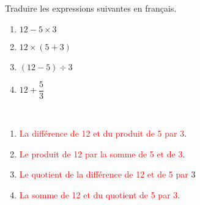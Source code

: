 \begin{exercice*}%
    Traduire les expressions suivantes en français.
    \begin{multicols}{2}
      \begin{enumerate}
         \item $12-5\times3$
         \item $12\times(5+3)$
         \item $(12-5)\div3$
         \item $12+\dfrac{5}{3}$
      \end{enumerate}
   \end{multicols}
 \end{exercice*}
 
 \begin{corrige}
    \ \\ [-5mm]
    \begin{enumerate}
       \item \textcolor{red}{La différence de 12 et du produit de 5 par 3}.
       \item \textcolor{red}{Le produit de 12 par la somme de 5 et de 3}.
       \item \textcolor{red}{Le quotient de la différence de 12 et de 5 par }3
       \item \textcolor{red}{La somme de 12 et du quotient de 5 par 3}.
    \end{enumerate}
 \end{corrige}